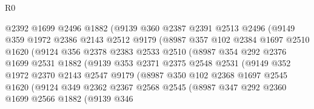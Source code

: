 \begin{lexlean}{R0}
\begin{coremodule}
                    @2392
                    @1699
                    @2496
                    @1882
                    (@9139
                      @360
                      @2387
                      @2391
                      @2513
                      @2496
                      (@9149
                        @359
                        @1972
                        @2386
                        @2143
                        @2512
                        @9179
                        (@8987
                          @357
                          @102
                          @2384
                          @1697
                          @2510
                          @1620
                          (@9124
                            @356
                            @2378
                            @2383
                            @2533
                            @2510
                            (@8987
                              @354
                              @292
                              @2376
                              @1699
                              @2531
                              @1882
                              (@9139
                                @353
                                @2371
                                @2375
                                @2548
                                @2531
                                (@9149
                                  @352
                                  @1972
                                  @2370
                                  @2143
                                  @2547
                                  @9179
                                  (@8987
                                    @350
                                    @102
                                    @2368
                                    @1697
                                    @2545
                                    @1620
                                    (@9124
                                      @349
                                      @2362
                                      @2367
                                      @2568
                                      @2545
                                      (@8987
                                        @347
                                        @292
                                        @2360
                                        @1699
                                        @2566
                                        @1882
                                        (@9139
                                          @346

\end{coremodule}
\end{lexlean}
